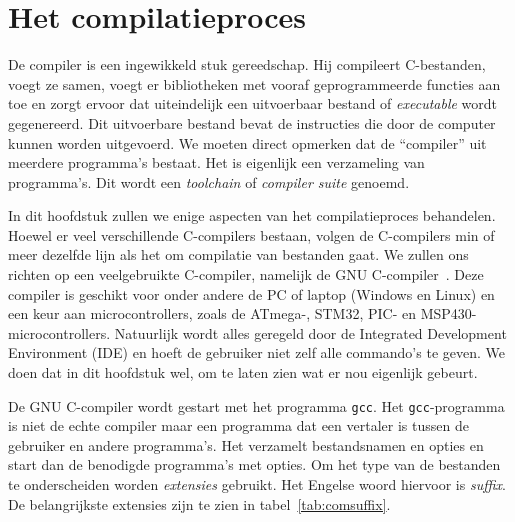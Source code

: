 \chapter{Het compilatieproces}
\label{cha:compilatieproces}
\thispagestyle{empty}

De compiler is een ingewikkeld stuk gereedschap. Hij compileert C-bestanden, voegt ze samen, voegt er bibliotheken met vooraf geprogrammeerde functies aan toe en zorgt ervoor dat uiteindelijk een uitvoerbaar bestand of \textsl{executable} wordt gegenereerd. Dit uitvoerbare bestand bevat de instructies die door de computer kunnen worden uitgevoerd. We moeten direct opmerken dat de ``compiler'' uit meerdere programma's bestaat. Het is eigenlijk een verzameling van programma's. Dit wordt een \textsl{toolchain} of \textsl{compiler suite} genoemd.

In dit hoofdstuk zullen we enige aspecten van het compilatieproces behandelen. Hoewel er veel verschillende C-compilers bestaan, volgen de C-compilers min of meer dezelfde lijn als het om compilatie van bestanden gaat. We zullen ons richten op een veelgebruikte C-compiler, namelijk de GNU C-compiler~\cite{gnugcc}. Deze compiler is geschikt voor onder andere de PC of laptop (Windows en Linux) en een keur aan microcontrollers, zoals de ATmega-, STM32, PIC- en MSP430-microcontrollers. Natuurlijk wordt alles geregeld door de Integrated Development Environment (IDE) en hoeft de gebruiker niet zelf alle commando's te geven. We doen dat in dit hoofdstuk wel, om te laten zien wat er nou eigenlijk gebeurt.


De GNU C-compiler wordt gestart met het programma \texttt{gcc}. Het \texttt{gcc}-programma is niet de echte compiler maar een programma dat een vertaler is tussen de gebruiker en andere programma's. Het verzamelt bestandsnamen en opties en start dan de benodigde programma's met opties.
%
Om het type van de bestanden te onderscheiden worden \textsl{extensies} gebruikt. Het Engelse woord hiervoor is \textsl{suffix}. De belangrijkste extensies zijn te zien in tabel~\ref{tab:comsuffix}.

